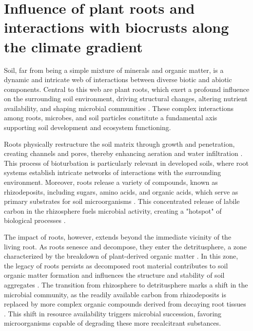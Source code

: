 \section{Influence of plant roots and interactions with biocrusts along the climate gradient}
\label{sec:PlantRootsBiocrust}

Soil, far from being a simple mixture of minerals and organic matter, is a dynamic and intricate web of interactions between diverse biotic and abiotic components. Central to this web are plant roots, which exert a profound influence on the surrounding soil environment, driving structural changes, altering nutrient availability, and shaping microbial communities \citep{Hinsinger2009}. These complex interactions among roots, microbes, and soil particles constitute a fundamental axis supporting soil development and ecosystem functioning.

Roots physically restructure the soil matrix through growth and penetration, creating channels and pores, thereby enhancing aeration and water infiltration \citep{Bruand1996}. This process of bioturbation is particularly relevant in developed soils, where root systems establish intricate networks of interactions with the surrounding environment. Moreover, roots release a variety of compounds, known as rhizodeposits, including sugars, amino acids, and organic acids, which serve as primary substrates for soil microorganisms \citep{Hinsinger2009,Rasse2005}. This concentrated release of labile carbon in the rhizosphere fuels microbial activity, creating a "hotspot" of biological processes \citep{Hinsinger2009}.

The impact of roots, however, extends beyond the immediate vicinity of the living root. As roots senesce and decompose, they enter the detritusphere, a zone characterized by the breakdown of plant-derived organic matter \citep{Vidal2018}. In this zone, the legacy of roots persists as decomposed root material contributes to soil organic matter formation and influences the structure and stability of soil aggregates \cite{Six2004}. The transition from rhizosphere to detritusphere marks a shift in the microbial community, as the readily available carbon from rhizodeposits is replaced by more complex organic compounds derived from decaying root tissues \citep{Vidal2018}. This shift in resource availability triggers microbial succession, favoring microorganisms capable of degrading these more recalcitrant substances.

